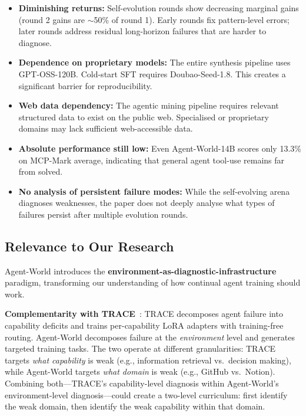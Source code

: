 \documentclass[11pt]{article}
\begin{document}
\begin{itemize}
    \item \textbf{Diminishing returns:} Self-evolution rounds show decreasing marginal gains (round 2 gains are $\sim$50\% of round 1). Early rounds fix pattern-level errors; later rounds address residual long-horizon failures that are harder to diagnose.

    \item \textbf{Dependence on proprietary models:} The entire synthesis pipeline uses GPT-OSS-120B. Cold-start SFT requires Doubao-Seed-1.8. This creates a significant barrier for reproducibility.

    \item \textbf{Web data dependency:} The agentic mining pipeline requires relevant structured data to exist on the public web. Specialised or proprietary domains may lack sufficient web-accessible data.

    \item \textbf{Absolute performance still low:} Even Agent-World-14B scores only 13.3\% on MCP-Mark average, indicating that general agent tool-use remains far from solved.

    \item \textbf{No analysis of persistent failure modes:} While the self-evolving arena diagnoses weaknesses, the paper does not deeply analyse what types of failures persist after multiple evolution rounds.
\end{itemize}

\subsection{Relevance to Our Research}

Agent-World introduces the \textbf{environment-as-diagnostic-infrastructure} paradigm, transforming our understanding of how continual agent training should work.

\textbf{Complementarity with TRACE}~\cite{trace}: TRACE decomposes agent failure into capability deficits and trains per-capability LoRA adapters with training-free routing. Agent-World decomposes failure at the \textit{environment} level and generates targeted training tasks. The two operate at different granularities: TRACE targets \textit{what capability} is weak (e.g., information retrieval vs.\ decision making), while Agent-World targets \textit{what domain} is weak (e.g., GitHub vs.\ Notion). Combining both---TRACE's capability-level diagnosis within Agent-World's environment-level diagnosis---could create a two-level curriculum: first identify the weak domain, then identify the weak capability within that domain.
\end{document}
